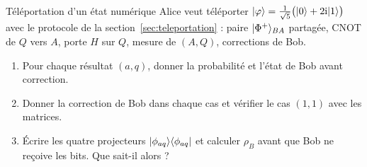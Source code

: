 \begin{exercice}{Téléportation d'un état numérique}\label{ex:telenum}
Alice veut téléporter $|\varphi\rangle=\frac{1}{\sqrt5}\big(|0\rangle+2\mathrm{i}|1\rangle\big)$ avec le protocole de la
section~\ref{sec:teleportation} : paire $|\Phi^+\rangle_{BA}$ partagée, CNOT de $Q$ vers $A$, porte $H$ sur
$Q$, mesure de $(A,Q)$, corrections de Bob.
\begin{enumerate}[label=\arabic*.,nosep]
  \item Pour chaque résultat $(a,q)$, donner la probabilité et l'état de Bob avant correction.
  \item Donner la correction de Bob dans chaque cas et vérifier le cas $(1,1)$ avec les matrices.
  \item Écrire les quatre projecteurs $|\phi_{aq}\rangle\langle \phi_{aq}|$ et calculer $\rho_B$ avant que
        Bob ne reçoive les bits. Que sait-il alors ?
\end{enumerate}
\end{exercice}
